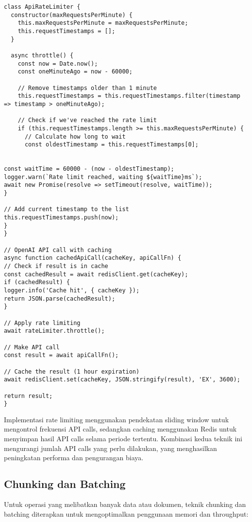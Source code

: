 \begin{verbatim}
class ApiRateLimiter {
  constructor(maxRequestsPerMinute) {
    this.maxRequestsPerMinute = maxRequestsPerMinute;
    this.requestTimestamps = [];
  }

  async throttle() {
    const now = Date.now();
    const oneMinuteAgo = now - 60000;
    
    // Remove timestamps older than 1 minute
    this.requestTimestamps = this.requestTimestamps.filter(timestamp => timestamp > oneMinuteAgo);
    
    // Check if we've reached the rate limit
    if (this.requestTimestamps.length >= this.maxRequestsPerMinute) {
      // Calculate how long to wait
      const oldestTimestamp = this.requestTimestamps[0];
      

const waitTime = 60000 - (now - oldestTimestamp);
logger.warn(`Rate limit reached, waiting ${waitTime}ms`);
await new Promise(resolve => setTimeout(resolve, waitTime));
}

// Add current timestamp to the list
this.requestTimestamps.push(now);
}
}

// OpenAI API call with caching
async function cachedApiCall(cacheKey, apiCallFn) {
// Check if result is in cache
const cachedResult = await redisClient.get(cacheKey);
if (cachedResult) {
logger.info('Cache hit', { cacheKey });
return JSON.parse(cachedResult);
}

// Apply rate limiting
await rateLimiter.throttle();

// Make API call
const result = await apiCallFn();

// Cache the result (1 hour expiration)
await redisClient.set(cacheKey, JSON.stringify(result), 'EX', 3600);

return result;
}
\end{verbatim}

Implementasi rate limiting menggunakan pendekatan sliding window untuk mengontrol frekuensi API calls, sedangkan caching menggunakan Redis untuk menyimpan hasil API calls selama periode tertentu. Kombinasi kedua teknik ini mengurangi jumlah API calls yang perlu dilakukan, yang menghasilkan peningkatan performa dan pengurangan biaya.

\subsection{Chunking dan Batching}
Untuk operasi yang melibatkan banyak data atau dokumen, teknik chunking dan batching diterapkan untuk mengoptimalkan penggunaan memori dan throughput:

